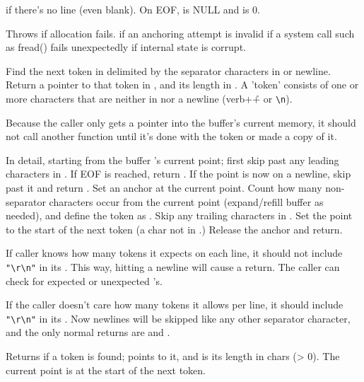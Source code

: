 \begin{sreapi}
 if there's no line (even blank).
On EOF,  is NULL and  is 0.

Throws  if allocation fails.
 if an anchoring attempt is invalid
 if a system call such as fread() fails unexpectedly
 if  internal state is corrupt.


\hypertarget{func:esl_buffer_GetToken()}
{\item[int esl\_buffer\_GetToken(ESL\_BUFFER *bf, const char *sep, char **opt\_tok, esl\_pos\_t *opt\_n)]}

Find the next token in  delimited by the separator
characters in  or newline. Return a pointer
to that token in , and its length in .
A 'token' consists of one or more characters that are
neither in  nor a newline (verb+\r+ or \verb+\n+).

Because the caller only gets a pointer into the buffer's
current memory, it should not call another
 function until it's done with the token
or made a copy of it.

In detail, starting from the buffer 's current
point; first skip past any leading characters in . If EOF
is reached, return . If the point is now on a
newline, skip past it and return . Set an anchor
at the current point. Count how many non-separator
characters  occur from the current point 
(expand/refill buffer as needed), and define the token
as . Skip any trailing characters in . 
Set the point to the start of the next token (a char not
in .) Release the anchor and return.

If caller knows how many tokens it expects on each line,
it should not include \verb+"\r\n"+ in its . This way,
hitting a newline will cause a  return. The
caller can check for expected or unexpected 's.

If the caller doesn't care how many tokens it allows per
line, it should include \verb+"\r\n"+ in its . Now
newlines will be skipped like any other separator
character, and the only normal returns are  and
.

Returns  if a token is found;  points to it,
and  is its length in chars (> 0). The current
point is at the start of the next token.


\end{sreapi}

